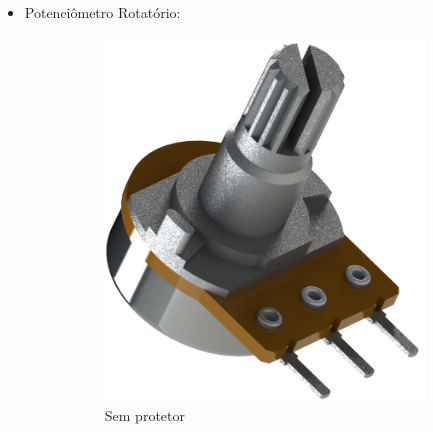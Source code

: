 \begin{itemize}
                \item Potenciômetro Rotatório:

                    \begin{figure}[H]
                        \centering
                        \begin{subfigure}{.5\textwidth}
                          \centering
                          \includegraphics[scale=0.2]{Imagens/SW_Images/potentiometer-10k-2.png}
                          \caption{Sem protetor}
                          \label{fig:Rotary_Potentiometer_without_protector}
                        \end{subfigure}%
                        \begin{subfigure}{.5\textwidth}
                          \centering

\end{subfigure}
\end{figure}
\end{itemize}
